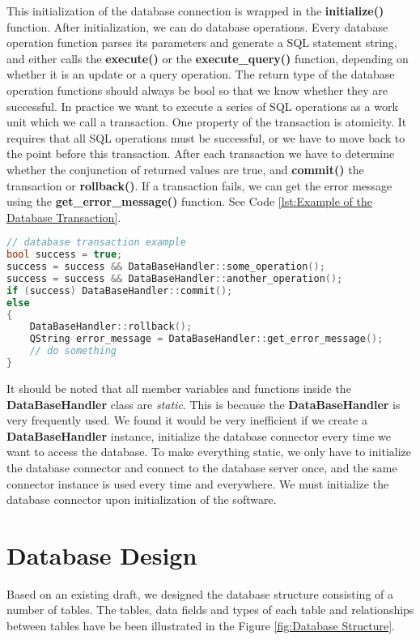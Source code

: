 This initialization of the database connection is wrapped in the \textbf{initialize()} function. After initialization, we can do database operations. Every database operation function parses its parameters and generate a SQL statement string, and either calls the \textbf{execute()} or the \textbf{execute\_query()} function, depending on whether it is an update or a query operation. The return type of the database operation functions should always be bool so that we know whether they are successful. In practice we want to execute a series of SQL operations as a work unit which we call a transaction. One property of the transaction is atomicity. It requires that all SQL operations must be successful, or we have to move back to the point before this transaction. After each transaction we have to determine whether the conjunction of returned values are true, and \textbf{commit()} the transaction or \textbf{rollback()}. If a transaction fails, we can get the error message using the \textbf{get\_error\_message()} function. See Code \ref{lst:Example of the Database Transaction}.

\begin{lstlisting}[language=C++, caption={Example of the Database Transaction\label{lst:Example of the Database Transaction}}]
// database transaction example
bool success = true;
success = success && DataBaseHandler::some_operation();
success = success && DataBaseHandler::another_operation();
if (success) DataBaseHandler::commit();
else
{
    DataBaseHandler::rollback();
    QString error_message = DataBaseHandler::get_error_message();
    // do something
}
\end{lstlisting}

It should be noted that all member variables and functions inside the \textbf{DataBaseHandler} class are \textit{static}. This is because the \textbf{DataBaseHandler} is very frequently used. We found it would be very inefficient if we create a \textbf{DataBaseHandler} instance, initialize the database connector every time we want to access the database. To make everything static, we only have to initialize the database connector and connect to the database server once, and the same connector instance is used every time and everywhere. We must initialize the database connector upon initialization of the software.

\section{Database Design}
Based on an existing draft, we designed the database structure consisting of a number of tables. The tables, data fields and types of each table and relationships between tables have be been illustrated in the Figure \ref{fig:Database Structure}. 

